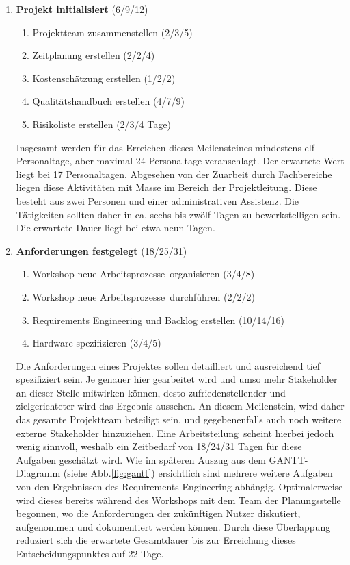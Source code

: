 \begin{enumerate}
	\item \textbf{Projekt initialisiert} (6/9/12)
	\begin{enumerate}
		\item Projektteam zusammenstellen (2/3/5)
		\item Zeitplanung erstellen (2/2/4)
		\item Kostenschätzung erstellen (1/2/2)
		\item Qualitätshandbuch erstellen (4/7/9)
		\item Risikoliste erstellen (2/3/4 Tage)
	\end{enumerate}
	
	Insgesamt werden für das Erreichen dieses Meilensteines mindestens elf Personaltage, aber maximal 24 Personaltage veranschlagt. Der erwartete Wert liegt bei 17 Personaltagen. Abgesehen von der Zuarbeit durch Fachbereiche liegen diese Aktivitäten mit Masse im Bereich der Projektleitung. Diese besteht aus zwei Personen und einer administrativen Assistenz. Die Tätigkeiten sollten daher in ca. sechs bis zwölf Tagen zu bewerkstelligen sein. Die erwartete Dauer liegt bei etwa neun Tagen. 	
	
	\item \textbf{Anforderungen festgelegt} (18/25/31)
	\begin{enumerate}
		\item Workshop \glqq neue Arbeitsprozesse\grqq\ organisieren (3/4/8)
		\item Workshop \glqq neue Arbeitsprozesse\grqq\ durchführen (2/2/2)
		\item Requirements Engineering und Backlog erstellen (10/14/16)
		\item Hardware spezifizieren (3/4/5)
	\end{enumerate}
	
	Die Anforderungen eines Projektes sollen detailliert und ausreichend tief spezifiziert sein. Je genauer hier gearbeitet wird und umso mehr Stakeholder an dieser Stelle mitwirken können, desto zufriedenstellender und zielgerichteter wird das Ergebnis aussehen. An diesem Meilenstein, wird daher das gesamte Projektteam beteiligt sein, und gegebenenfalls auch noch weitere externe Stakeholder hinzuziehen. Eine \glqq Arbeitsteilung\grqq\ scheint hierbei jedoch wenig sinnvoll, weshalb ein Zeitbedarf von 18/24/31 Tagen für diese Aufgaben geschätzt wird. Wie im späteren Auszug aus dem GANTT-Diagramm (siehe Abb.\ref{fig:gantt}) ersichtlich sind mehrere weitere Aufgaben von den Ergebnissen des Requirements Engineering abhängig. Optimalerweise wird dieses bereits während des Workshops mit dem Team der Planungsstelle begonnen, wo die  Anforderungen der zukünftigen Nutzer diskutiert, aufgenommen und dokumentiert werden können. Durch diese Überlappung reduziert sich die erwartete Gesamtdauer bis zur Erreichung dieses Entscheidungspunktes auf 22 Tage.
	

\end{enumerate}
